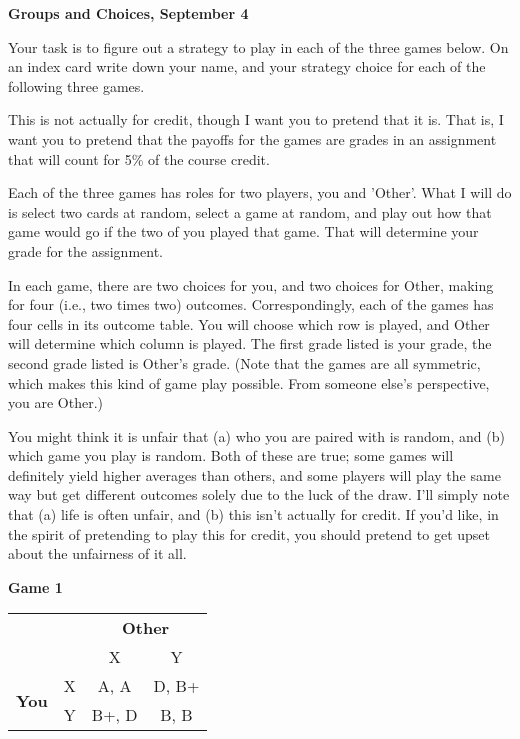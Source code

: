 \documentclass[11pt]{article}
\begin{document}
\begin{center}
\begin{large}
\textbf{Groups and Choices, September 4}
\end{large}
\end{center}

\noindent Your task is to figure out a strategy to play in each of the three games below. On an index card write down your name, and your strategy choice for each of the following three games.

This is not actually for credit, though I want you to pretend that it is. That is, I want you to pretend that the payoffs for the games are grades in an assignment that will count for 5\% of the course credit.

Each of the three games has roles for two players, you and 'Other'. What I will do is select two cards at random, select a game at random, and play out how that game would go if the two of you played that game. That will determine your grade for the assignment.

In each game, there are two choices for you, and two choices for Other, making for four (i.e., two times two) outcomes. Correspondingly, each of the games has four cells in its outcome table. You will choose which row is played, and Other will determine which column is played. The first grade listed is your grade, the second grade listed is Other’s grade. (Note that the games are all symmetric, which makes this kind of game play possible. From someone else’s perspective, you are Other.)

You might think it is unfair that (a) who you are paired with is random, and (b) which game you play is random. Both of these are true; some games will definitely yield higher averages than others, and some players will play the same way but get different outcomes solely due to the luck of the draw. I'll simply note that (a) life is often unfair, and (b) this isn't actually for credit. If you’d like, in the spirit of pretending to play this for credit, you should pretend to get upset about the unfairness of it all.

\bigskip
\begin{large}
\textbf{Game 1}
\end{large}

\begin{center}
\begin{tabular}{l r | c c}
 & & \multicolumn{2}{c}{\textbf{Other}} \\
& & X & Y \\ \hline
\multirow{2}{*}{\textbf{You}} & X & A, A & D, B+ \\ & Y & B+, D & B, B \\
\end{tabular}
\end{center}
\end{document}

